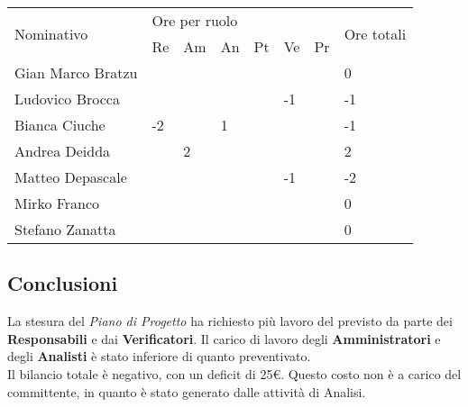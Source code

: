 \begin{flushleft}
\begin{table}[h]
    \begin{tabular}{|l|l|l|l|l|l|l|l|}
    \hline
    \multirow{2}{*}{Nominativo} & \multicolumn{6}{l|}{Ore per ruolo} & \multirow{2}{*}{Ore totali} \\ \cline{2-7}
                                & Re   & Am  & An  & Pt  & Ve  & Pr  &                             \\ \hline
    Gian Marco Bratzu           &      &     &     &     &     &     & 0                           \\ \hline
    Ludovico Brocca             &      &     &     &     & -1  &     & -1                          \\ \hline
    Bianca Ciuche               & -2   &     & 1   &     &     &     & -1                          \\ \hline
    Andrea Deidda               &      & 2   &     &     &     &     & 2                           \\ \hline
    Matteo Depascale            &      &     &     &     & -1  &     & -2                          \\ \hline
    Mirko Franco                &      &     &     &     &     &     & 0                           \\ \hline
    Stefano Zanatta             &      &     &     &     &     &     & 0                           \\ \hline
    \end{tabular}
    \end{table}
\subsection{Conclusioni}
La stesura del \textit{Piano di Progetto} ha richiesto più lavoro del previsto da parte dei \textbf{Responsabili} e dai \textbf{Verificatori}. Il carico di lavoro degli \textbf{Amministratori} e degli \textbf{Analisti} è stato inferiore di quanto preventivato.\\ Il bilancio totale è negativo, con un deficit di 25\euro. Questo costo non è a carico del committente, in quanto è stato generato dalle attività di Analisi.
\end{flushleft}